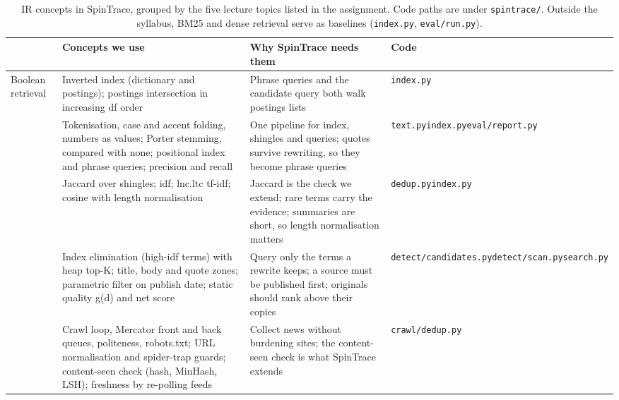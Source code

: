 \documentclass[11pt,a4paper]{article}
\newcommand{\hd}[1]{{\headfont\bfseries\footnotesize #1}}
\newcommand{\hrow}{\rowcolor{paper}}
\newcommand{\code}[1]{\texttt{#1}}
\begin{document}
\begin{table}[t]
  \centering\small
  \caption{IR concepts in SpinTrace, grouped by the five lecture topics listed in the assignment. Code paths are under \code{spintrace/}. Outside the syllabus, BM25 and dense retrieval serve as baselines (\code{index.py}, \code{eval/run.py}).}
  \label{tab:concepts}
  \footnotesize
  \begin{tabularx}{\textwidth}{@{}P{2.5cm}P{5.4cm}LP{3.2cm}@{}}
    \toprule
    \hrow \hd{Lecture topic} & \hd{Concepts we use} & \hd{Why SpinTrace needs them} & \hd{Code} \\
    \midrule
    {\headfont Boolean retrieval} & Inverted index (dictionary and postings); postings intersection in increasing df order & Phrase queries and the candidate query both walk postings lists & \code{index.py} \\
     & Tokenisation, case and accent folding, numbers as values; Porter stemming, compared with none; positional index and phrase queries; precision and recall & One pipeline for index, shingles and queries; quotes survive rewriting, so they become phrase queries & \code{text.py}\newline\code{index.py}\newline\code{eval/report.py} \\
     & Jaccard over shingles; idf; lnc.ltc tf-idf; cosine with length normalisation & Jaccard is the check we extend; rare terms carry the evidence; summaries are short, so length normalisation matters & \code{dedup.py}\newline\code{index.py} \\
     & Index elimination (high-idf terms) with heap top-K; title, body and quote zones; parametric filter on publish date; static quality g(d) and net score & Query only the terms a rewrite keeps; a source must be published first; originals should rank above their copies & \code{detect/candidates.py}\newline\code{detect/scan.py}\newline\code{search.py} \\
     & Crawl loop, Mercator front and back queues, politeness, robots.txt; URL normalisation and spider-trap guards; content-seen check (hash, MinHash, LSH); freshness by re-polling feeds & Collect news without burdening sites; the content-seen check is what SpinTrace extends & \code{crawl/}\newline\code{dedup.py} \\

\end{tabularx}
\end{table}
\end{document}
